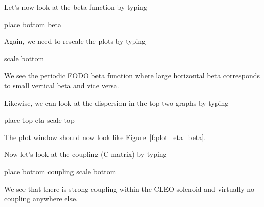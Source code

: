 \documentclass{report}
\begin{document}
Let's now look at the beta function by typing
\begin{example}
  place bottom beta
\end{example}
Again, we need to rescale the plots by typing
\begin{example}
  scale bottom
\end{example}
We see the periodic FODO beta function where large horizontal beta corresponds to
small vertical beta and vice versa.

Likewise, we can look at the dispersion in the top two graphs by typing
\begin{example}
  place top eta
  scale top
\end{example}
The plot window should now look like Figure~\ref{f:plot_eta_beta}.

Now let's look at the coupling (C-matrix) by typing
\begin{example}
  place bottom coupling
  scale bottom
\end{example}
We see that there is strong coupling within the CLEO solenoid and virtually no
coupling anywhere else.
\end{document}
